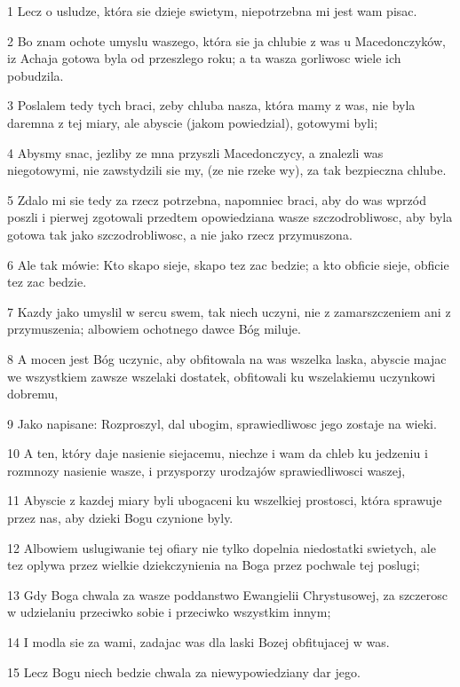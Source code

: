\par 1 Lecz o usludze, która sie dzieje swietym, niepotrzebna mi jest wam pisac.
\par 2 Bo znam ochote umyslu waszego, która sie ja chlubie z was u Macedonczyków, iz Achaja gotowa byla od przeszlego roku; a ta wasza gorliwosc wiele ich pobudzila.
\par 3 Poslalem tedy tych braci, zeby chluba nasza, która mamy z was, nie byla daremna z tej miary, ale abyscie (jakom powiedzial), gotowymi byli;
\par 4 Abysmy snac, jezliby ze mna przyszli Macedonczycy, a znalezli was niegotowymi, nie zawstydzili sie my, (ze nie rzeke wy), za tak bezpieczna chlube.
\par 5 Zdalo mi sie tedy za rzecz potrzebna, napomniec braci, aby do was wprzód poszli i pierwej zgotowali przedtem opowiedziana wasze szczodrobliwosc, aby byla gotowa tak jako szczodrobliwosc, a nie jako rzecz przymuszona.
\par 6 Ale tak mówie: Kto skapo sieje, skapo tez zac bedzie; a kto obficie sieje, obficie tez zac bedzie.
\par 7 Kazdy jako umyslil w sercu swem, tak niech uczyni, nie z zamarszczeniem ani z przymuszenia; albowiem ochotnego dawce Bóg miluje.
\par 8 A mocen jest Bóg uczynic, aby obfitowala na was wszelka laska, abyscie majac we wszystkiem zawsze wszelaki dostatek, obfitowali ku wszelakiemu uczynkowi dobremu,
\par 9 Jako napisane: Rozproszyl, dal ubogim, sprawiedliwosc jego zostaje na wieki.
\par 10 A ten, który daje nasienie siejacemu, niechze i wam da chleb ku jedzeniu i rozmnozy nasienie wasze, i przysporzy urodzajów sprawiedliwosci waszej,
\par 11 Abyscie z kazdej miary byli ubogaceni ku wszelkiej prostosci, która sprawuje przez nas, aby dzieki Bogu czynione byly.
\par 12 Albowiem uslugiwanie tej ofiary nie tylko dopelnia niedostatki swietych, ale tez oplywa przez wielkie dziekczynienia na Boga przez pochwale tej poslugi;
\par 13 Gdy Boga chwala za wasze poddanstwo Ewangielii Chrystusowej, za szczerosc w udzielaniu przeciwko sobie i przeciwko wszystkim innym;
\par 14 I modla sie za wami, zadajac was dla laski Bozej obfitujacej w was.
\par 15 Lecz Bogu niech bedzie chwala za niewypowiedziany dar jego.

